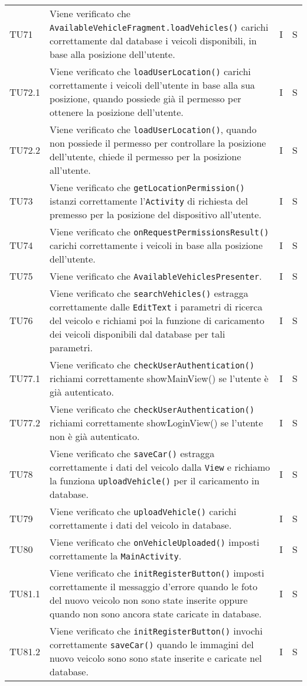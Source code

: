 \begin{longtable}{ >{\centering}p{}  >{\centering}p{} >{\centering}p{}
			>{\centering}p{}}
		TU71 & Viene verificato che \texttt{AvailableVehicleFragment.loadVehicles()} carichi correttamente dal database i veicoli disponibili, in base alla posizione dell'utente. & I & S
		\tabularnewline	
		TU72.1 & Viene verificato che \texttt{loadUserLocation()} carichi correttamente i veicoli dell'utente in base alla sua posizione, quando possiede già il permesso per ottenere la posizione dell'utente. & I & S
		\tabularnewline	
		TU72.2 & Viene verificato che \texttt{loadUserLocation()}, quando non possiede il permesso per controllare la posizione dell'utente, chiede il permesso per la posizione all'utente. & I & S
		\tabularnewline	
		TU73 & Viene verificato che \texttt{getLocationPermission()} istanzi correttamente l'\texttt{Activity} di richiesta del premesso per la posizione del dispositivo all'utente. & I & S
		\tabularnewline	
		TU74 & Viene verificato che \texttt{onRequestPermissionsResult()} carichi correttamente i veicoli in base alla posizione dell'utente. & I & S
		\tabularnewline	
		TU75 & Viene verificato che \texttt{AvailableVehiclesPresenter}. & I & S
		\tabularnewline	
		TU76 & Viene verificato che \texttt{searchVehicles()} estragga correttamente dalle \texttt{EditText} i parametri di ricerca del veicolo e richiami poi la funzione di caricamento dei veicoli disponibili dal database per tali parametri. & I & S
		\tabularnewline	
		TU77.1 & Viene verificato che \texttt{checkUserAuthentication()} richiami correttamente showMainView() se l'utente è già autenticato. & I & S
		\tabularnewline	
		TU77.2 & Viene verificato che \texttt{checkUserAuthentication()} richiami correttamente showLoginView() se l'utente non è già autenticato. & I & S
		\tabularnewline	
		TU78 & Viene verificato che \texttt{saveCar()} estragga correttamente i dati del veicolo dalla \texttt{View} e richiamo la funziona \texttt{uploadVehicle()} per il caricamento in database. & I & S
		\tabularnewline	
		TU79 & Viene verificato che \texttt{uploadVehicle()} carichi correttamente i dati del veicolo in database. & I & S
		\tabularnewline	
		TU80 & Viene verificato che \texttt{onVehicleUploaded()} imposti correttamente la \texttt{MainActivity}. & I & S
		\tabularnewline	
		TU81.1 & Viene verificato che \texttt{initRegisterButton()} imposti correttamente il messaggio d'errore quando le foto del nuovo veicolo non sono state inserite oppure quando non sono ancora state caricate in database. & I & S
		\tabularnewline	
		TU81.2 & Viene verificato che \texttt{initRegisterButton()} invochi correttamente \texttt{saveCar()} quando le immagini del nuovo veicolo sono sono state inserite e caricate nel database. & I & S

\end{longtable}

